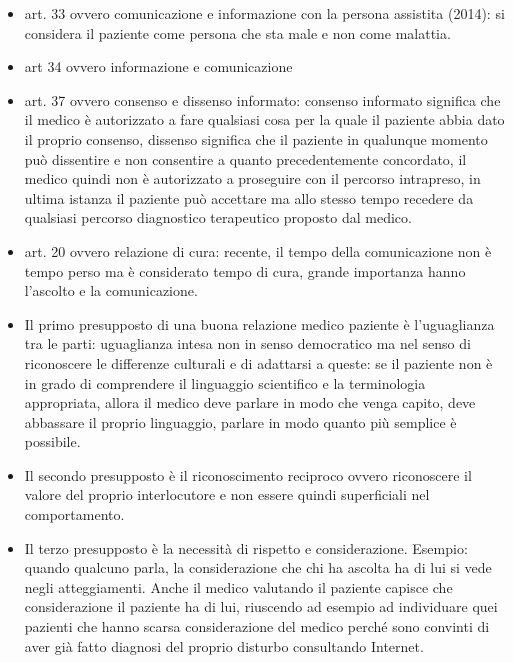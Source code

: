\begin{itemize}
\item
  art. 33 ovvero comunicazione e informazione con la persona assistita
  (2014): si considera il paziente come persona che sta male e non come
  malattia.
\item
  art 34 ovvero informazione e comunicazione
\item
  art. 37 ovvero consenso e dissenso informato: consenso informato
  significa che il medico è autorizzato a fare qualsiasi cosa per la
  quale il paziente abbia dato il proprio consenso, dissenso significa
  che il paziente in qualunque momento può dissentire e non consentire a
  quanto precedentemente concordato, il medico quindi non è autorizzato
  a proseguire con il percorso intrapreso, in ultima istanza il paziente
  può accettare ma allo stesso tempo recedere da qualsiasi percorso
  diagnostico terapeutico proposto dal medico.
\item
  art. 20 ovvero relazione di cura: recente, il tempo della
  comunicazione non è tempo perso ma è considerato tempo di cura, grande
  importanza hanno l'ascolto e la comunicazione.
\end{itemize}

\begin{itemize}
\item
  Il primo presupposto di una buona relazione medico paziente è
  l'uguaglianza tra le parti: uguaglianza intesa non in senso
  democratico ma nel senso di riconoscere le differenze culturali e di
  adattarsi a queste: se il paziente non è in grado di comprendere il
  linguaggio scientifico e la terminologia appropriata, allora il medico
  deve parlare in modo che venga capito, deve abbassare il proprio
  linguaggio, parlare in modo quanto più semplice è possibile.
\item
  Il secondo presupposto è il riconoscimento reciproco ovvero
  riconoscere il valore del proprio interlocutore e non essere quindi
  superficiali nel comportamento.
\item
  Il terzo presupposto è la necessità di rispetto e considerazione.
  Esempio: quando qualcuno parla, la considerazione che chi ha ascolta
  ha di lui si vede negli atteggiamenti. Anche il medico valutando il
  paziente capisce che considerazione il paziente ha di lui, riuscendo
  ad esempio ad individuare quei pazienti che hanno scarsa
  considerazione del medico perché sono convinti di aver già fatto
  diagnosi del proprio disturbo consultando Internet.
\end{itemize}

